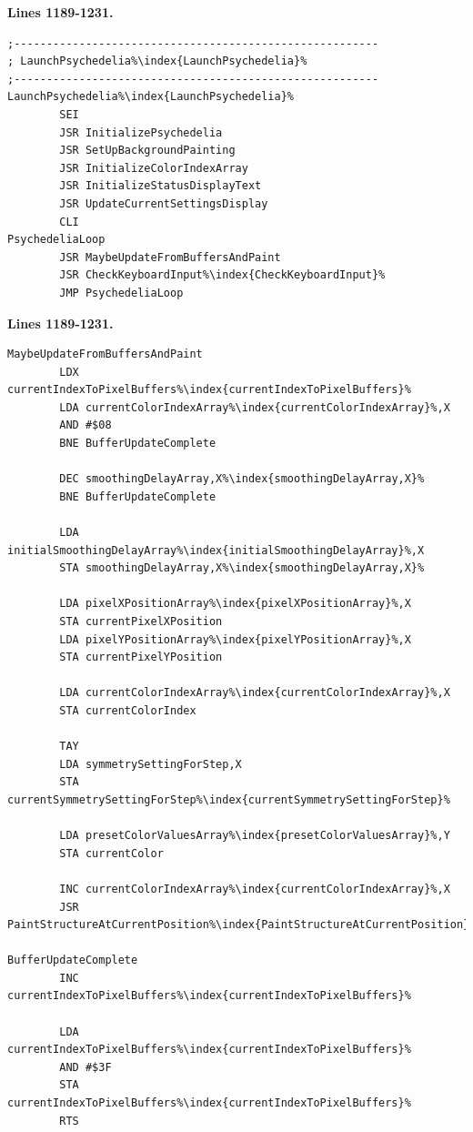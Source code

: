 \clearpage
\textbf{Lines 1189-1231. } 
\begin{lstlisting}[escapechar=\%]
;--------------------------------------------------------
; LaunchPsychedelia%\index{LaunchPsychedelia}%
;--------------------------------------------------------
LaunchPsychedelia%\index{LaunchPsychedelia}%
        SEI 
        JSR InitializePsychedelia
        JSR SetUpBackgroundPainting
        JSR InitializeColorIndexArray
        JSR InitializeStatusDisplayText
        JSR UpdateCurrentSettingsDisplay
        CLI 
PsychedeliaLoop   
        JSR MaybeUpdateFromBuffersAndPaint
        JSR CheckKeyboardInput%\index{CheckKeyboardInput}%
        JMP PsychedeliaLoop
\end{lstlisting}
\textbf{Lines 1189-1231. } 
\begin{lstlisting}[basicstyle=\ttfamily\scriptsize, caption=The routine responsible for painting patterns.,escapechar=\%]
MaybeUpdateFromBuffersAndPaint   
        LDX currentIndexToPixelBuffers%\index{currentIndexToPixelBuffers}%
        LDA currentColorIndexArray%\index{currentColorIndexArray}%,X
        AND #$08
        BNE BufferUpdateComplete

        DEC smoothingDelayArray,X%\index{smoothingDelayArray,X}%
        BNE BufferUpdateComplete

        LDA initialSmoothingDelayArray%\index{initialSmoothingDelayArray}%,X
        STA smoothingDelayArray,X%\index{smoothingDelayArray,X}%

        LDA pixelXPositionArray%\index{pixelXPositionArray}%,X
        STA currentPixelXPosition
        LDA pixelYPositionArray%\index{pixelYPositionArray}%,X
        STA currentPixelYPosition

        LDA currentColorIndexArray%\index{currentColorIndexArray}%,X
        STA currentColorIndex

        TAY 
        LDA symmetrySettingForStep,X
        STA currentSymmetrySettingForStep%\index{currentSymmetrySettingForStep}%

        LDA presetColorValuesArray%\index{presetColorValuesArray}%,Y
        STA currentColor

        INC currentColorIndexArray%\index{currentColorIndexArray}%,X
        JSR PaintStructureAtCurrentPosition%\index{PaintStructureAtCurrentPosition}%

BufferUpdateComplete   
        INC currentIndexToPixelBuffers%\index{currentIndexToPixelBuffers}%

        LDA currentIndexToPixelBuffers%\index{currentIndexToPixelBuffers}%
        AND #$3F
        STA currentIndexToPixelBuffers%\index{currentIndexToPixelBuffers}%
        RTS 
\end{lstlisting}
\clearpage

